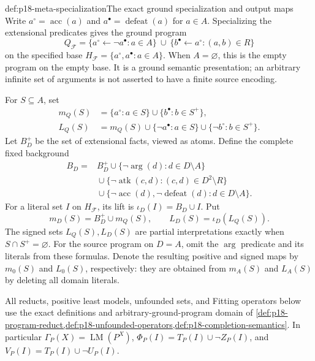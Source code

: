\begin{hbdefinition}{def:p18-meta-specialization}{The exact ground specialization and output maps}
Write \(a^\circ=\operatorname{acc}(a)\) and
\(a^\bullet=\operatorname{defeat}(a)\) for \(a\in A\).
Specializing the extensional predicates gives the ground program
\[
 Q_{\mathcal F}=
 \{a^\circ\leftarrow\neg a^\bullet:a\in A\}
 \ \cup\
 \{b^\bullet\leftarrow a^\circ:(a,b)\in R\}
\]
on the specified base \(H_{\mathcal F}=\{a^\circ,a^\bullet:a\in A\}\).
When \(A=\varnothing\), this is the empty program on the empty base.
It is a ground semantic presentation; an arbitrary infinite set
of arguments is not asserted to have a finite source encoding.

For \(S\subseteq A\), set
\[
\begin{aligned}
 m_Q(S)&=\{a^\circ:a\in S\}\cup\{b^\bullet:b\in S^+\},\\
 L_Q(S)&=m_Q(S)\cup\{\neg a^\bullet:a\in S\}
                         \cup\{\neg b^\circ:b\in S^+\}.
\end{aligned}
\]
Let \(B_D^+\) be the set of extensional facts, viewed as atoms.
Define the complete fixed background
\[
\begin{aligned}
 B_D={}&B_D^+
 \cup\{\neg\operatorname{arg}(d):d\in D\setminus A\}\\
 &{}\cup\{\neg\operatorname{atk}(c,d):(c,d)\in D^2\setminus R\}\\
 &{}\cup\{\neg\operatorname{acc}(d),\neg\operatorname{defeat}(d):
                                                  d\in D\setminus A\}.
\end{aligned}
\]
For a literal set \(I\) on \(H_{\mathcal F}\), its lift is
\(\iota_D(I)=B_D\cup I\). Put
\[
             m_D(S)=B_D^+\cup m_Q(S),\qquad
             L_D(S)=\iota_D(L_Q(S)).
\]
The signed sets \(L_Q(S),L_D(S)\) are partial interpretations
exactly when \(S\cap S^+=\varnothing\).
For the source program on \(D=A\), omit the
\(\operatorname{arg}\) predicate and its literals from these formulas.
Denote the resulting positive and signed maps by \(m_0(S)\)
and \(L_0(S)\), respectively: they are obtained from \(m_A(S)\)
and \(L_A(S)\) by deleting all domain literals.
\end{hbdefinition}

All reducts, positive least models, unfounded sets, and Fitting
operators below use the exact definitions and arbitrary-ground-program
domain of \cref{def:p18-program-reduct,def:p18-unfounded-operators,def:p18-completion-semantics}. In particular
\(\Gamma_P(X)=\operatorname{LM}(P^X)\),
\(\Phi_P(I)=T_P(I)\cup\neg Z_P(I)\), and
\(V_P(I)=T_P(I)\cup\neg U_P(I)\).

